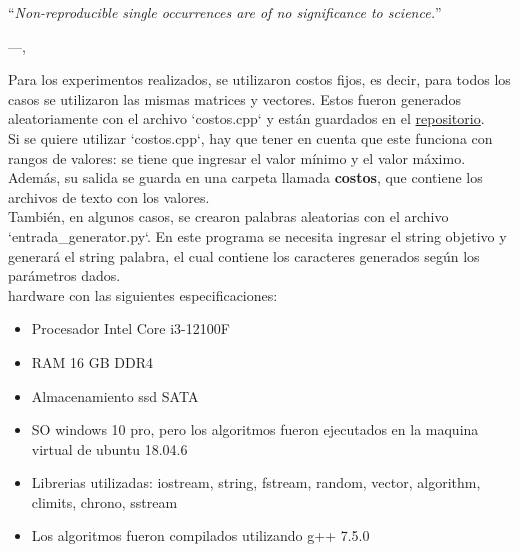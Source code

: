 


\epigraph{``\textit{Non-reproducible single occurrences are of no significance to
science.}''}{---\citeauthor{popper2005logic},\citeyear{popper2005logic} \cite{popper2005logic}}


Para los experimentos realizados, se utilizaron costos fijos, es decir, para todos los casos se utilizaron las mismas matrices y vectores. Estos fueron generados aleatoriamente con el archivo `costos.cpp` y están guardados en el \href{https://github.com/Mappo1562/DistanciaMinimaDeEdicionExtendida}{repositorio}. \\
Si se quiere utilizar `costos.cpp`, hay que tener en cuenta que este funciona con rangos de valores: se tiene que ingresar el valor mínimo y el valor máximo. Además, su salida se guarda en una carpeta llamada \textbf{costos}, que contiene los archivos de texto con los valores.\\
También, en algunos casos, se crearon palabras aleatorias con el archivo `entrada\_generator.py`. En este programa se necesita ingresar el string objetivo y generará el string palabra, el cual contiene los caracteres generados según los parámetros dados. \\
hardware con las siguientes especificaciones:

\begin{itemize}
    \item Procesador Intel Core i3-12100F
    \item RAM 16 GB DDR4
    \item Almacenamiento ssd SATA
    \item SO windows 10 pro, pero los algoritmos fueron ejecutados en la maquina virtual de ubuntu 18.04.6
    \item Librerias utilizadas: iostream, string, fstream, random, vector, algorithm, climits, chrono, sstream
    \item Los algoritmos fueron compilados utilizando g++ 7.5.0
\end{itemize}